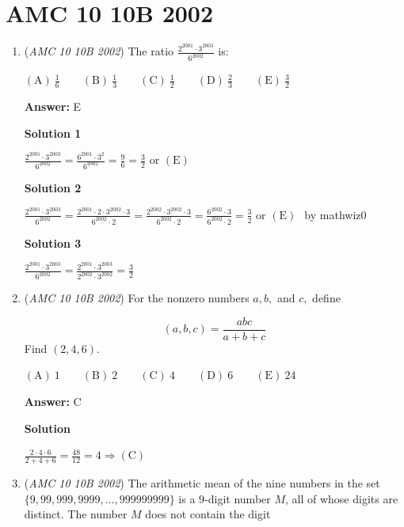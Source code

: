 \section{AMC 10 10B 2002}
        \begin{enumerate}
        	\item (\textit{AMC 10 10B 2002}) The ratio $\frac{2^{2001}\cdot3^{2003}}{6^{2002}}$ is:


 $\mathrm{(A) \ } \frac{1}{6}\qquad \mathrm{(B) \ } \frac{1}{3}\qquad \mathrm{(C) \ } \frac{1}{2}\qquad \mathrm{(D) \ } \frac{2}{3}\qquad \mathrm{(E) \ } \frac{3}{2}$

 \textbf{Answer: }E



\textbf{Solution 1}

$\frac{2^{2001}\cdot3^{2003}}{6^{2002}}=\frac{6^{2001}\cdot 3^2}{6^{2002}}=\frac{9}{6}=\frac{3}{2}$ or $\mathrm{ (E) \ }$




\textbf{Solution 2}

$\frac{2^{2001}\cdot3^{2003}}{6^{2002}}=\frac{2^{2001}\cdot 2\cdot 3^{2002}\cdot 3}{6^{2002}\cdot 2}=\frac{2^{2002} \cdot 3^{2002} \cdot 3}{6^{2002}\cdot 2}=\frac{6^{2002}\cdot 3}{6^{2002}\cdot 2}=\frac{3}{2}$ or $\mathrm{ (E) \ }$~by mathwiz0

 



\textbf{Solution 3}

$\frac{2^{2001}\cdot3^{2003}}{6^{2002}}=\frac{2^{2001}\cdot3^{2003}}{2^{2002}\cdot3^{2002}}=\frac{3}{2}$



	\item (\textit{AMC 10 10B 2002}) For the nonzero numbers $a, b,$ and $c,$ define

 \[(a,b,c)=\frac{abc}{a+b+c}\]
Find $(2,4,6)$.


 $\mathrm{(A) \ } 1\qquad \mathrm{(B) \ } 2\qquad \mathrm{(C) \ } 4\qquad \mathrm{(D) \ } 6\qquad \mathrm{(E) \ } 24$

 \textbf{Answer: }C



\textbf{Solution}

$\frac{2\cdot 4\cdot 6}{2+4+6}=\frac{48}{12}=4\Longrightarrow\mathrm{ (C) \ }$



	\item (\textit{AMC 10 10B 2002}) The arithmetic mean of the nine numbers in the set $\{9,99,999,9999,\ldots,999999999\}$ is a $9$-digit number $M$, all of whose digits are distinct. The number $M$ does not contain the digit



\end{enumerate}
